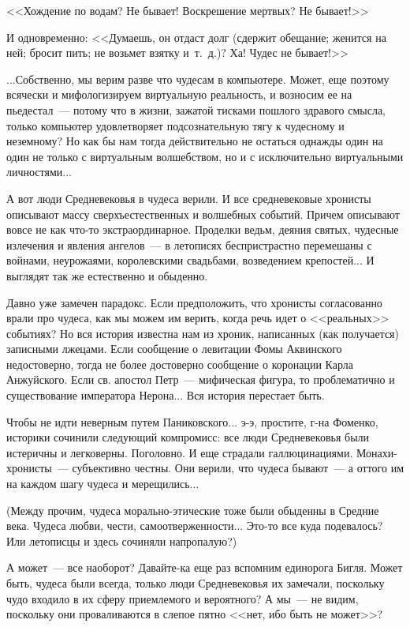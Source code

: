 \documentclass{scrbook}
\newcommand{\flqq}{<<}
\newcommand{\frqq}{>>}
\newcommand{\mdash}{~--- }
\begin{document}
{\flqq}Хождение по водам? Не бывает! Воскрешение мертвых? Не бывает!{\frqq}

И одновременно: {\flqq}Думаешь, он отдаст долг (сдержит обещание; женится на ней; бросит пить; не возьмет взятку и~т.~д.)? Ха! Чудес не бывает!{\frqq}

...Собственно, мы верим разве что чудесам в компьютере. Может, еще поэтому всячески и мифологизируем виртуальную реальность, и возносим ее на пьедестал{\mdash}потому что в жизни, зажатой тисками пошлого здравого смысла, только компьютер удовлетворяет подсознательную тягу к чудесному и неземному? Но как бы нам тогда действительно не остаться однажды один на один не только с виртуальным волшебством, но и с исключительно виртуальными личностями...

А вот люди Средневековья в чудеса верили. И все средневековые хронисты описывают массу сверхъестественных и волшебных событий. Причем описывают вовсе не как что-то экстраординарное. Проделки ведьм, деяния святых, чудесные излечения и явления ангелов{\mdash}в летописях беспристрастно перемешаны с войнами, неурожаями, королевскими свадьбами, возведением крепостей... И выглядят так же естественно и обыденно.

Давно уже замечен парадокс. Если предположить, что хронисты согласованно врали про чудеса, как мы можем им верить, когда речь идет о {\flqq}реальных{\frqq} событиях? Но вся история известна нам из хроник, написанных (как получается) записными лжецами. Если сообщение о левитации Фомы Аквинского недостоверно, тогда не более достоверно сообщение о коронации Карла Анжуйского. Если св. апостол Петр{\mdash}мифическая фигура, то проблематично и существование императора Нерона... Вся история перестает быть.

Чтобы не идти неверным путем Паниковского... э-э, простите, г-на Фоменко, историки сочинили следующий компромисс: все люди Средневековья были истеричны и легковерны. Поголовно. И еще страдали галлюцинациями. Монахи-хронисты{\mdash}субъективно честны. Они верили, что чудеса бывают{\mdash}а оттого им на каждом шагу чудеса и мерещились...

(Между прочим, чудеса морально-этические тоже были обыденны в Средние века. Чудеса любви, чести, самоотверженности... Это-то все куда подевалось? Или летописцы и здесь сочиняли напропалую?)

А может{\mdash}все наоборот? Давайте-ка еще раз вспомним единорога Бигля. Может быть, чудеса были всегда, только люди Средневековья их замечали, поскольку чудо входило в их сферу приемлемого и вероятного? А мы{\mdash}не видим, поскольку они проваливаются в слепое пятно {\flqq}нет, ибо быть не может{\frqq}?
\end{document}
